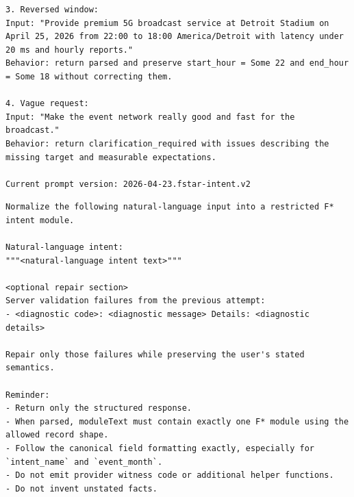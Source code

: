 \documentclass[conference]{IEEEtran}
\begin{document}
\begin{lstlisting}[style=prompt,caption={System prompt for version 2026-04-23.fstar-intent.v2.},label={lst:llm-system-prompt}]
3. Reversed window:
Input: "Provide premium 5G broadcast service at Detroit Stadium on April 25, 2026 from 22:00 to 18:00 America/Detroit with latency under 20 ms and hourly reports."
Behavior: return parsed and preserve start_hour = Some 22 and end_hour = Some 18 without correcting them.

4. Vague request:
Input: "Make the event network really good and fast for the broadcast."
Behavior: return clarification_required with issues describing the missing target and measurable expectations.

Current prompt version: 2026-04-23.fstar-intent.v2
\end{lstlisting}

\begin{lstlisting}[style=prompt,caption={User-message template paired with the system prompt.},label={lst:llm-user-prompt}]
Normalize the following natural-language input into a restricted F* intent module.

Natural-language intent:
"""<natural-language intent text>"""

<optional repair section>
Server validation failures from the previous attempt:
- <diagnostic code>: <diagnostic message> Details: <diagnostic details>

Repair only those failures while preserving the user's stated semantics.

Reminder:
- Return only the structured response.
- When parsed, moduleText must contain exactly one F* module using the allowed record shape.
- Follow the canonical field formatting exactly, especially for `intent_name` and `event_month`.
- Do not emit provider witness code or additional helper functions.
- Do not invent unstated facts.
\end{lstlisting}



\end{document}
